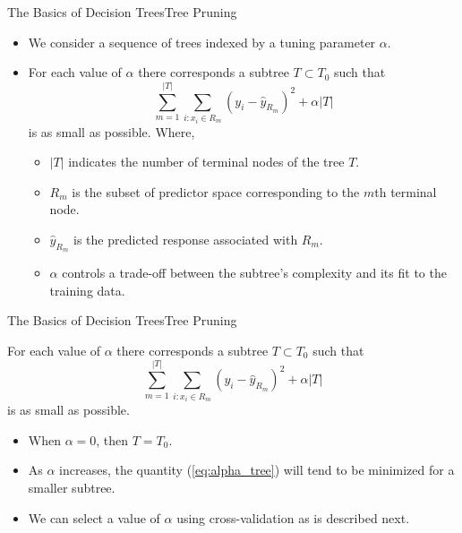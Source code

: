 \begin{frame}{The Basics of Decision Trees}{Tree Pruning}
    \begin{itemize}
        \item  We consider a sequence of trees indexed by a tuning parameter $\alpha$. \pause
        
        \item For each value of $\alpha$ there corresponds a subtree $T \subset T_0$ such that \pause 
        \begin{equation*}
            \sum_{m=1}^{|T|} \sum_{i: x_i \in R_m} (y_i - \hat{y}_{R_m})^2 + \alpha |T|
        \end{equation*} 
    is as small as possible. \pause 
        Where, 
        \begin{itemize}
            \item $|T|$ indicates the number of terminal nodes of the tree $T$. \pause 
            \item $R_m$ is the subset of predictor space corresponding to the $m$th terminal node. \pause 
            \item $\hat{y}_{R_{m}}$ is the predicted response associated with $R_m$. \pause 
            \item $\alpha$ controls a trade-oﬀ between the subtree's complexity and its fit to the training data.
        \end{itemize}
    \end{itemize}


\end{frame}

\begin{frame}{The Basics of Decision Trees}{Tree Pruning}

For each value of $\alpha$ there corresponds a subtree $T \subset T_0$ such that \pause 
        \begin{equation}\label{eq:alpha_tree}
            \sum_{m=1}^{|T|} \sum_{i: x_i \in R_m} (y_i - \hat{y}_{R_m})^2 + \alpha |T|
        \end{equation} 
    is as small as possible. \pause 

\begin{itemize}
    \item When $\alpha = 0$, then $T = 
T_0$. \pause

    \item As $\alpha$ increases, the quantity (\ref{eq:alpha_tree}) will tend to be minimized for a smaller subtree. 

    \item We can select a value of $\alpha$ using cross-validation as is described next. 
\end{itemize}

\end{frame}


